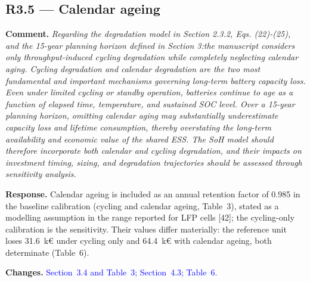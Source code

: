 \documentclass[11pt]{article}
\newcommand{\rcomment}[1]{\par\medskip\noindent\textbf{Comment.} \textit{#1}\par\smallskip}
\newcommand{\rresponse}[1]{\noindent\textbf{Response.} #1\par\smallskip}
\newcommand{\rchanges}[1]{\noindent\textbf{Changes.} \textcolor{blue}{#1}\par\medskip}
\begin{document}
\subsection*{R3.5 --- Calendar ageing}
\rcomment{
Regarding the degradation model in Section 2.3.2, Eqs. (22)-(25), and the 15-year planning horizon defined in Section 3:the manuscript considers only throughput-induced cycling degradation while completely neglecting calendar aging. Cycling degradation and calendar degradation are the two most fundamental and important mechanisms governing long-term battery capacity loss. Even under limited cycling or standby operation, batteries continue to age as a function of elapsed time, temperature, and sustained SOC level. Over a 15-year planning horizon, omitting calendar aging may substantially underestimate capacity loss and lifetime consumption, thereby overstating the long-term availability and economic value of the shared ESS. The SoH model should therefore incorporate both calendar and cycling degradation, and their impacts on investment timing, sizing, and degradation trajectories should be assessed through sensitivity analysis.
}
\rresponse{Calendar ageing is included as an annual retention factor of 0.985 in the baseline calibration (cycling and calendar ageing, Table~3), stated as a modelling assumption in the range reported for LFP cells [42]; the cycling-only calibration is the sensitivity. Their values differ materially: the reference unit loses 31.6~k\euro{} under cycling only and 64.4~k\euro{} with calendar ageing, both determinate (Table~6).}
\rchanges{Section~3.4 and Table~3; Section~4.3; Table~6.}
\end{document}
